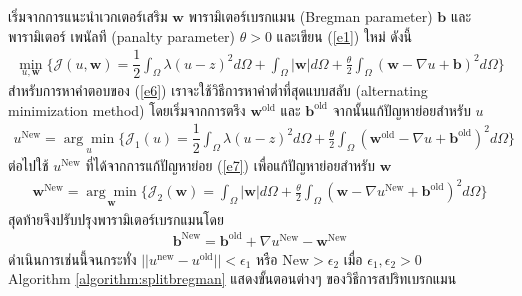 \hspace{1cm} เริ่มจากการแนะนำเวกเตอร์เสริม $\boldsymbol{w}$ พารามิเตอร์เบรกแมน (Bregman parameter) $\boldsymbol{b}$ และพารามิเตอร์ \break เพนัลที (panalty parameter) $\theta>0$ และเขียน (\ref{e1}) ใหม่ ดังนี้
\begin{align}
	\min_{u,\boldsymbol{w}} \{ \mathcal{J}(u,\boldsymbol{w}) = \dfrac{1}{2} \int_{\Omega} \lambda(u-z)^2 d\Omega +  \int_{\Omega}  | \boldsymbol{w}|  d\Omega + \frac{\theta}{2} \int_{\Omega} (\boldsymbol{w} - \nabla u + \boldsymbol{b})^{2} d\Omega \}
	\label{e6}
\end{align}
\hspace{1cm}สำหรับการหาคำตอบของ (\ref{e6}) เราจะใช้วิธีการหาค่าต่ำที่สุดแบบสลับ (alternating minimization method) โดยเริ่มจากการตรึง $\boldsymbol{w}^{\text{old}}$ และ $\boldsymbol{b}^{\text{old}}$ จากนั้นแก้ปัญหาย่อยสำหรับ $u$
\begin{align}
	u^{\text{New}}=\underset{u}{\arg\min} \{ \mathcal{J}_1(u) = \dfrac{1}{2} \int_{\Omega} \lambda(u-z)^2 d\Omega + \frac{\theta}{2} \int_{\Omega} (\boldsymbol{w}^{\text{old}} - \nabla u + \boldsymbol{b}^{\text{old}})^{2} d\Omega \}
	\label{e7}
\end{align}
ต่อไปใช้ $u^{\text{New}}$ ที่ได้จากการแก้ปัญหาย่อย (\ref{e7}) เพื่อแก้ปัญหาย่อยสำหรับ $\boldsymbol{w}$
\begin{align}
	\boldsymbol{w}^{\text{New}}=\underset{\boldsymbol{w}}{\arg\min} \{ \mathcal{J}_2(\boldsymbol{w}) = \int_{\Omega}  |\boldsymbol{w}|  d\Omega  + \frac{\theta}{2} \int_{\Omega} (\boldsymbol{w} - \nabla u^{\text{New}} + \boldsymbol{b}^{\text{old}})^{2} d\Omega \}
	\label{e8}
\end{align}
	สุดท้ายจึงปรับปรุงพารามิเตอร์เบรกแมนโดย 
\begin{align}
	\boldsymbol{b}^{\text{New}}=\boldsymbol{b}^{\text{old}}+\nabla u^{\text{New}}-\boldsymbol{w}^{\text{New}}
	\label{e9}
\end{align}
ดำเนินการเช่นนี้จนกระทั่ง $||u^{\text{new}}-u^{\text{old}}||< \epsilon_1$ หรือ $\text{New}>\epsilon_2$ เมื่อ $\epsilon_1,\epsilon_2>0$ \\ 
\vspace{0.5cm}
\hspace{1cm} Algorithm \ref{algorithm:splitbregman} แสดงขั้นตอนต่างๆ ของวิธีการสปริทเบรกแมน \\
\vspace{0.5cm}

\vspace{0.5cm}

